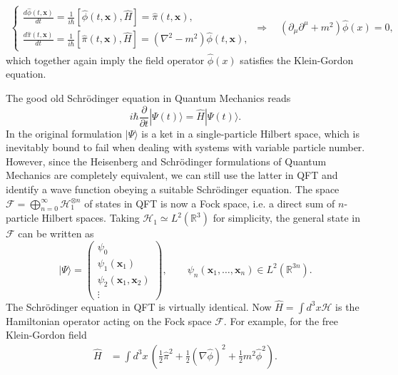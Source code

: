 \documentclass[../QFT_main.tex]{subfiles}
\begin{document}
\begin{mytheorem}
{\small\begin{align}\label{eq:heisenberg_equation_KG_field}
    \begin{cases}\displaystyle
    \frac{d\hat{\phi}(t, \mathbf{x})}{dt} = \tfrac{1}{i \hbar} [\hat{\phi}(t, \mathbf{x}), \hat{H}] = \hat{\pi}(t, \mathbf{x}), \\[7pt]
    \displaystyle
    \frac{d\hat{\pi}(t, \mathbf{x})}{dt} = \tfrac{1}{i \hbar} [\hat{\pi}(t, \mathbf{x}), \hat{H}] = (\nabla^2 - m^2) \hat{\phi}(t, \mathbf{x}),
    \end{cases}
    \,\Rightarrow\quad  (\partial_{\mu} \partial^{\mu} + m^2) \hat{\phi}(x) = 0,
\end{align}}
which together again imply the field operator $\hat{\phi}(x)$ satisfies the Klein-Gordon equation.
%
\end{mytheorem}


\begin{mytheorem}
%
The good old Schrödinger equation in Quantum Mechanics reads
\begin{equation}
    i \hbar \frac{\partial}{\partial t} |\Psi(t)\rangle = \hat{H} |\Psi(t)\rangle.
\end{equation}
In the original formulation $|\Psi\rangle$ is a ket in a single-particle Hilbert space, which is inevitably bound to fail when dealing with systems with variable particle number.
%
However, since the Heisenberg and Schrödinger formulations of Quantum Mechanics are completely equivalent, we can still use the latter in QFT and identify a wave function obeying a suitable Schrödinger equation.
The space $\mathcal{F}=\bigoplus_{n=0}^{\infty} \mathcal{H}_1^{\otimes n}$ of states in QFT is now a Fock space, i.e. a direct sum of $n$-particle Hilbert spaces.
Taking $\mathcal{H}_1\simeq L^2(\mathbb{R}^3)$ for simplicity, the general state in $\mathcal{F}$ can be written as
\begin{equation}
    |\Psi\rangle = \left( \begin{array}{c}
    \psi_0 \\
    \psi_1(\mathbf{x}_1) \\
    \psi_2(\mathbf{x}_1, \mathbf{x}_2) \\
    \vdots
    \end{array} \right),\qquad \psi_n(\mathbf{x}_1, \ldots, \mathbf{x}_n) \in L^2(\mathbb{R}^{3n}).
\end{equation}
%
The Schrödinger equation in QFT is virtually identical.
Now $\hat{H}=\int d^3x \mathcal{H}$ is the Hamiltonian operator acting on the Fock space $\mathcal{F}$.
For example, for the free Klein-Gordon field
\begin{align}
    \hat{H} &= \int d^3 x\, \left( \frac{1}{2} \hat{\pi}^2 + \frac{1}{2} (\nabla \hat{\phi})^2 + \frac{1}{2} m^2 \hat{\phi}^2 \right).
\end{align}
%    
\end{mytheorem}
\end{document}
